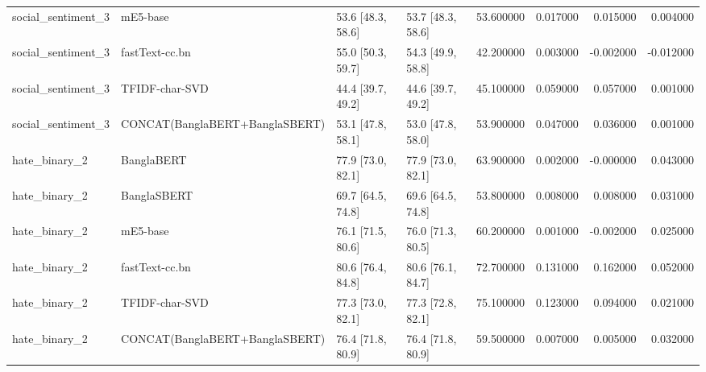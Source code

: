 \begin{table}
\begin{tabular}{llllrrrr}
social_sentiment_3 & mE5-base & 53.6 [48.3, 58.6] & 53.7 [48.3, 58.6] & 53.600000 & 0.017000 & 0.015000 & 0.004000 \\
social_sentiment_3 & fastText-cc.bn & 55.0 [50.3, 59.7] & 54.3 [49.9, 58.8] & 42.200000 & 0.003000 & -0.002000 & -0.012000 \\
social_sentiment_3 & TFIDF-char-SVD & 44.4 [39.7, 49.2] & 44.6 [39.7, 49.2] & 45.100000 & 0.059000 & 0.057000 & 0.001000 \\
social_sentiment_3 & CONCAT(BanglaBERT+BanglaSBERT) & 53.1 [47.8, 58.1] & 53.0 [47.8, 58.0] & 53.900000 & 0.047000 & 0.036000 & 0.001000 \\
hate_binary_2 & BanglaBERT & 77.9 [73.0, 82.1] & 77.9 [73.0, 82.1] & 63.900000 & 0.002000 & -0.000000 & 0.043000 \\
hate_binary_2 & BanglaSBERT & 69.7 [64.5, 74.8] & 69.6 [64.5, 74.8] & 53.800000 & 0.008000 & 0.008000 & 0.031000 \\
hate_binary_2 & mE5-base & 76.1 [71.5, 80.6] & 76.0 [71.3, 80.5] & 60.200000 & 0.001000 & -0.002000 & 0.025000 \\
hate_binary_2 & fastText-cc.bn & 80.6 [76.4, 84.8] & 80.6 [76.1, 84.7] & 72.700000 & 0.131000 & 0.162000 & 0.052000 \\
hate_binary_2 & TFIDF-char-SVD & 77.3 [73.0, 82.1] & 77.3 [72.8, 82.1] & 75.100000 & 0.123000 & 0.094000 & 0.021000 \\
hate_binary_2 & CONCAT(BanglaBERT+BanglaSBERT) & 76.4 [71.8, 80.9] & 76.4 [71.8, 80.9] & 59.500000 & 0.007000 & 0.005000 & 0.032000 \\
\bottomrule
\end{tabular}
\end{table}
